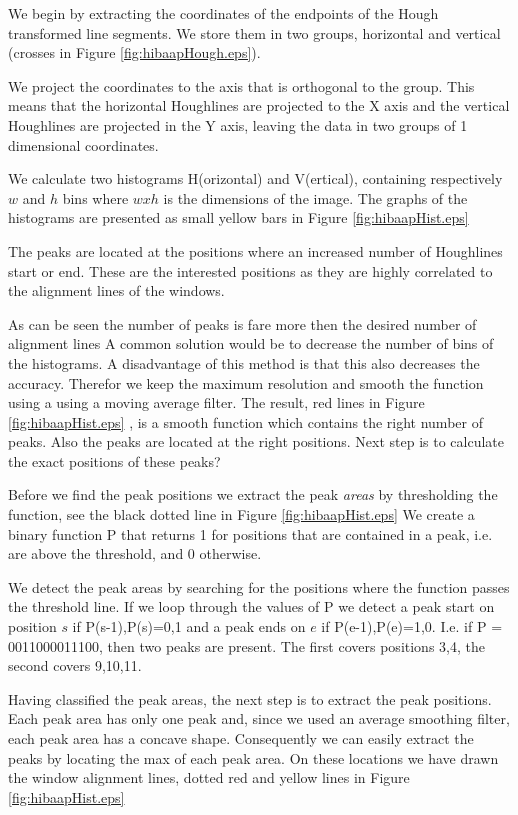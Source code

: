 We begin by extracting the coordinates of the endpoints of the Hough transformed line
segments. We store them in two groups, horizontal and vertical (crosses in Figure
\ref{fig:hibaapHough.eps}). 


We project the coordinates to the axis that is orthogonal to the group. This means
that the horizontal Houghlines are projected to the X axis and the vertical
Houghlines are projected in the Y axis, leaving the data in two groups of 1
dimensional coordinates.

We calculate two histograms H(orizontal) and V(ertical), containing respectively
$w$ and $h$ bins where $w x h$ is the dimensions of the image.  The graphs of
the histograms are presented as small yellow bars in Figure
\ref{fig:hibaapHist.eps}

The peaks are located at the positions where an increased number of Houghlines
start or end.  These are the interested positions as they are highly correlated
to the alignment lines of the windows. 

As can be seen the number of peaks is fare more then the desired number of alignment lines 
A common solution would be to decrease the number of bins of the histograms. A
disadvantage of this method is that this also decreases the accuracy. Therefor
we keep the maximum resolution and smooth the function using a using a moving
average filter.
The result, red lines in Figure \ref{fig:hibaapHist.eps}
, is a smooth function which contains the right number of peaks. Also the peaks
are located at the right positions. Next step is to calculate the exact positions of these
peaks?

Before we find the peak positions we extract the peak \emph{areas} by thresholding the
function, see the black dotted line in Figure \ref{fig:hibaapHist.eps}
We create a binary function P that returns 1 for positions that are contained in
a peak, i.e. are above the threshold, and 0 otherwise.

We detect the peak areas by searching for the positions where the function
passes the threshold line. 
If we loop through the values of P we detect a peak start on position $s$ if {P(s-1),P(s)}={0,1}
and a peak ends on $e$ if {P(e-1),P(e)}={1,0}. 
I.e. if P = 0011000011100, then two peaks are present. The first covers positions {3,4}, 
the second covers {9,10,11}. 

Having classified the peak areas, the next step is to extract the peak positions. 
Each peak area has only one peak and, since we used an average smoothing filter, each
peak area has a concave shape. Consequently we can easily extract the peaks
by locating the max of each peak area. 
On these locations we have drawn the window alignment lines, dotted red and yellow lines
in Figure \ref{fig:hibaapHist.eps}

